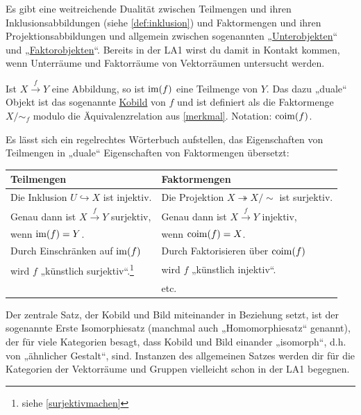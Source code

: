 \begin{vorschau} \label{teilmengenvsfaktormengen} 
    Es gibt eine weitreichende Dualität zwischen Teilmengen und ihren Inklusionsabbildungen (siehe \cref{def:inklusion}) und Faktormengen und ihren Projektionsabbildungen und allgemein zwischen sogenannten „\href{https://ncatlab.org/nlab/show/subobject}{Unterobjekten}“ und „\href{https://ncatlab.org/nlab/show/quotient+object}{Faktorobjekten}“. Bereits in der LA1 wirst du damit in Kontakt kommen, wenn Unterräume und Faktorräume von Vektorräumen untersucht werden.
    
    Ist $X\xrightarrow{f} Y$ eine Abbildung, so ist $\operatorname{im}(f)$ eine Teilmenge von $Y$. Das dazu „duale“ Objekt ist das sogenannte \href{https://ncatlab.org/nlab/show/coimage}{Kobild} von $f$ und ist definiert als die Faktormenge $X/{\sim_f}$ modulo die Äquivalenzrelation aus \cref{merkmal}. Notation: $\operatorname{coim}(f)$.
    
    Es lässt sich ein regelrechtes Wörterbuch aufstellen, das Eigenschaften von Teilmengen in „duale“ Eigenschaften von Faktormengen übersetzt:
    \begin{longtable}{ll}
    Teilmengen & Faktormengen \\
    \midrule
    Die Inklusion $U\hookrightarrow X$ ist injektiv. & Die Projektion $X\twoheadrightarrow X/{\sim}$ ist surjektiv. \\
    Genau dann ist $X\xrightarrow{f} Y$ surjektiv,  & Genau dann ist $X\xrightarrow{f} Y$ injektiv, \\
    \quad wenn $\operatorname{im}(f)=Y$. & \quad wenn $\operatorname{coim}(f)=X$. \\
    Durch Einschränken auf $\operatorname{im}(f)$ & Durch Faktorisieren über $\operatorname{coim}(f)$ \\
    \quad wird $f$ „künstlich surjektiv“.\footnote{siehe \cref{surjektivmachen}} & \quad wird $f$ „künstlich injektiv“. \\
     & \hfill etc. 
    \end{longtable}
    
    \noindent Der zentrale Satz, der Kobild und Bild miteinander in Beziehung setzt, ist der sogenannte Erste Isomorphiesatz (manchmal auch „Homomorphiesatz“ genannt), der für viele Kategorien besagt, dass Kobild und Bild einander „isomorph“, d.h. von „ähnlicher Gestalt“, sind. Instanzen des allgemeinen Satzes werden dir für die Kategorien der Vektorräume und Gruppen vielleicht schon in der LA1 begegnen.
\end{vorschau}


